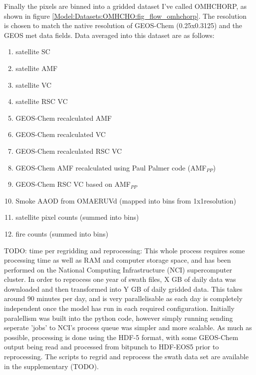     Finally the pixels are binned into a gridded dataset I've called OMHCHORP, as shown in figure \ref{Model:Datasets:OMHCHO:fig_flow_omhchorp}.
    The resolution is chosen to match the native resolution of GEOS-Chem (0.25x0.3125\degr) and the GEOS met data fields.
    Data averaged into this dataset are as follows:
    \begin{enumerate}
      \item satellite SC %
      \item satellite AMF %
      \item satellite VC %
      \item satellite RSC VC %
      \item GEOS-Chem recalculated AMF %
      \item GEOS-Chem recalculated VC %
      \item GEOS-Chem recalculated RSC VC %
      \item GEOS-Chem AMF recalculated using Paul Palmer code (AMF$_{PP}$)
      \item GEOS-Chem RSC VC based on AMF$_{PP}$
      \item Smoke AAOD from OMAERUVd (mapped into bins from 1x1\degr resolution)
      \item satellite pixel counts (summed into bins)
      \item fire counts (summed into bins)
    \end{enumerate}
    
    TODO: time per regridding and reprocessing:
    This whole process requires some processing time as well as RAM and computer storage space, and has been performed on the National Computing Infrastructure (NCI) supercomputer cluster.
    In order to reprocess one year of swath files, X GB of daily data was downloaded and then transformed into Y GB of daily gridded data.
    This takes around 90 minutes per day, and is very parallelisable as each day is completely independent once the model has run in each required configuration.
    Initially paralellism was built into the python code, however simply running sending seperate 'jobs' to NCI's process queue was simpler and more scalable.
    As much as possible, processing is done using the HDF-5 format, with some GEOS-Chem output being read and processed from bitpunch to HDF-EOS5 prior to reprocessing.
    The scripts to regrid and reprocess the swath data set are available in the supplementary (TODO).
  
